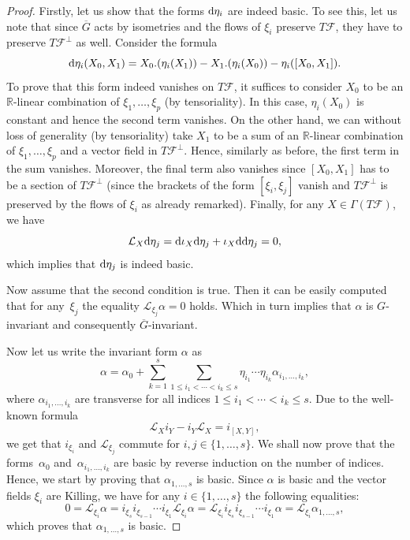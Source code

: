 \documentclass[10pt,a4paper]{amsart}
\numberwithin{equation}{section}
\theoremstyle{definition}
\begin{document}
\begin{proof}
Firstly, let us show that the forms ${\rm d}\eta_i$ are indeed basic. To see this, let us note that since $\overline{G}$ acts by isometries and the flows of $\xi_i$ preserve $T\mathcal{F}$, they have to preserve $T\mathcal{F}^{\perp}$ as well. Consider the formula
\[{\rm d}\eta_i(X_0,X_1)= X_0.(\eta_i(X_1))-X_1.(\eta_i(X_0)) -\eta_i([X_0,X_1]).\]
To prove that this form indeed vanishes on $T\mathcal{F}$, it suffices to consider $X_0$ to be an $\mathbb{R}$-linear combination of $\xi_1,\dots,\xi_p$ (by tensoriality). In this case, $\eta_i(X_0)$ is constant and hence the second term vanishes. On the other hand, we can without loss of generality (by tensoriality) take $X_1$ to be a sum of an $\mathbb{R}$-linear combination of $\xi_1,\dots,\xi_p$ and a vector field in $T\mathcal{F}^{\perp}$. Hence, similarly as before, the first term in the sum vanishes. Moreover, the final term also vanishes since $[X_0,X_1]$ has to be a section of $T\mathcal{F}^{\perp}$ (since the brackets of the form $[\xi_i,\xi_j]$ vanish and $T\mathcal{F}^{\perp}$ is preserved by the flows of $\xi_i$ as already remarked). Finally, for any $X\in\Gamma(T\mathcal{F})$, we have{\samepage
\[\mathcal{L}_X{\rm d}\eta_j={\rm d}\iota_X{\rm d}\eta_j+\iota_X{\rm d}{\rm d}\eta_j=0,\]
which implies that ${\rm d}\eta_j$ is indeed basic.}

Now assume that the second condition is true. Then it can be easily computed that for any~$\xi_j$ the equality $\mathcal{L}_{\xi_j}\alpha=0$ holds. Which in turn implies that $\alpha$ is $G$-invariant and consequently $\overline{G}$-invariant.

Now let us write the invariant form $\alpha$ as
\[\alpha=\alpha_0+\sum\limits_{k=1}^s\sum\limits_{1\leq i_1<\cdots <i_k\leq s}\eta_{i_1}\cdots \eta_{i_k}\alpha_{i_1,\dots,i_k},\]
where $\alpha_{i_1,\dots,i_k}$ are transverse for all indices $1\leq i_1<\cdots <i_k\leq s$. Due to the well-known formula
\[\mathcal{L}_{X}i_{Y}-i_{Y}\mathcal{L}_{X}=i_{[X,Y]},\]
we get that $i_{\xi_i}$ and $\mathcal{L}_{\xi_j}$ commute for $i,j\in\{1,\dots,s\}$. We shall now prove that the forms~$\alpha_0$ and~${\alpha_{i_1,\dots,i_k}}$ are basic by reverse induction on the number of indices. Hence, we start by proving that $\alpha_{1,\dots,s}$ is basic. Since $\alpha$ is basic and the vector fields $\xi_i$ are Killing, we have for any ${i\in\{1,\dots,s\}}$ the following equalities:
\[0=\mathcal{L}_{\xi_i}\alpha=i_{\xi_s}i_{\xi_{s-1}}\cdots i_{\xi_1}\mathcal{L}_{\xi_i}\alpha=\mathcal{L}_{\xi_i}i_{\xi_{s}}i_{\xi_{s-1}}\cdots i_{\xi_1}\alpha=\mathcal{L}_{\xi_i}\alpha_{1,\dots,s},\]
which proves that $\alpha_{1,\dots,s}$ is basic.


\end{proof}
\end{document}
